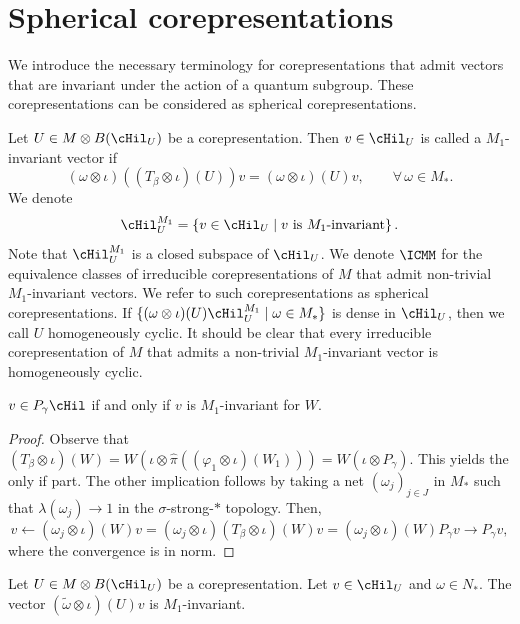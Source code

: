 \section{Spherical corepresentations}\label{SectSphericalCoreps}
 We introduce the necessary terminology for corepresentations that admit vectors that are invariant under the action of a quantum subgroup. These corepresentations can be considered as spherical corepresentations.


\begin{dfn}\label{DfnMOneInv}
 Let $U \in M \otimes B(\cHil_U)$ be a corepresentation. Then  $v \in \cHil_U$   is called a $M_1$-invariant vector if
\[
 (\omega \otimes \iota)((T_\beta \otimes \iota)(U)) v = (\omega \otimes \iota)(U)v, \qquad \forall\, \omega\in M_\ast.
\]
 We denote
\[
\cHil_U^{M_1} = \left\{v \in \cHil_U \mid v \textrm{ is } M_1 \textrm{-invariant} \right\}.
\]
 Note that $\cHil_U^{M_1}$ is a closed subspace of $\cHil_U$. We denote
$
\ICMM
$
 for the equivalence classes of irreducible corepresentations of $M$ that admit non-trivial $M_1$-invariant vectors. We refer to such corepresentations as spherical corepresentations. If $\{ (\omega \otimes \iota)(U) \cHil_U^{M_1} \mid \omega \in M_\ast \}$ is dense in $\cHil_U$, then we call $U$ homogeneously cyclic. It should be clear that every irreducible corepresentation of $M$ that admits a non-trivial $M_1$-invariant vector is homogeneously cyclic.
 \end{dfn}

\begin{prop}\label{PropMOneInv}
$ v \in P_\gamma \cHil$ if and only if $v$ is $M_1$-invariant for $W$.
\end{prop}
\begin{proof}
Observe that $ (T_\beta \otimes \iota)(W) = W \left(\iota \otimes \hat{\pi}((\varphi_1 \otimes \iota)(W_1))\right) = W (\iota \otimes P_\gamma)$. This yields the only if part. The other implication follows by taking a  net $(\omega_j)_{j \in J}$ in $M_\ast$ such that $\lambda(\omega_j) \rightarrow 1$ in the $\sigma$-strong-$\ast$ topology. Then,
\[
v \leftarrow (\omega_j \otimes \iota)(W) v =  (\omega_j \otimes \iota)(T_\beta \otimes \iota)(W) v = (\omega_j \otimes \iota)( W)  P_\gamma v \rightarrow P_\gamma v,
\]
where the convergence is in norm.
\end{proof}


\begin{lem}
 Let $U \in M \otimes B(\cHil_U)$ be a corepresentation. Let $v \in \cHil_U$ and $\omega \in N_\ast$. The vector $(\tilde{\omega} \otimes \iota)(U) v$ is $M_1$-invariant.
\end{lem}

